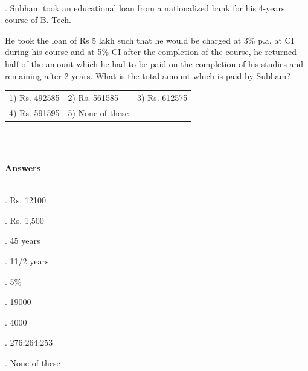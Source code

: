 \documentclass{article}
\begin{document}
	\noindent 
	
	\noindent  \\  
	
	. Subham took an educational loan from a nationalized bank for his 4-years course of B. Tech.
	
	\noindent 
	
	\noindent He took the loan of Rs 5 lakh such that he would be charged at 3\% p.a. at CI during his course and at 5\% CI after the completion of the course, he returned half of the amount which he had to be paid on the completion of his studies and remaining after 2 years. What is the total amount which is paid by Subham?
	
	\noindent 
	
	\noindent 
	
		\begin{tabular}{p{1.7in} p{1.6in} p{1.6in}} \\ 
 1) Rs. 492585 & 2) Rs. 561585 & 3) Rs. 612575 
		\\
4) Rs. 591595  & 5) None of these  \\
\end{tabular}  \\ 

	

\newpage
	
	\noindent  \\  \textbf{Answers}
	
	\noindent 
	
	\noindent  \\  
	
	.   Rs. 12100
	
	\noindent 
	
	.   Rs. 1,500
	
	\noindent 
	
	.   45 years
	
	\noindent 
	
	.   11/2 years
	
	\noindent 
	
	.   5\%
	
	\noindent 
	
	.   19000
	
	\noindent 
	
	.   4000
	
	\noindent 
	
	.   276:264:253
	
	\noindent 
	
	.   None of these
	
\end{document}
